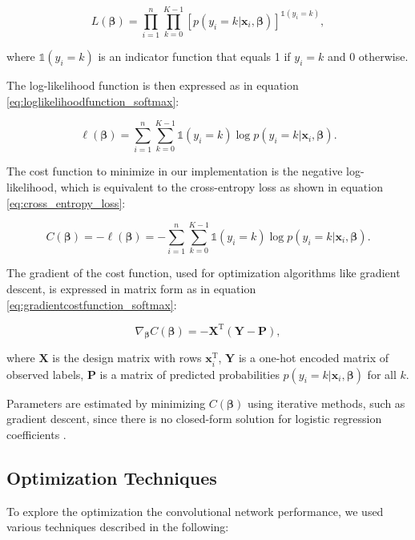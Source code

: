\begin{equation}
L(\boldsymbol{\beta}) = \prod_{i=1}^n \prod_{k=0}^{K-1} [p(y_i = k \vert \boldsymbol{x}_i, \boldsymbol{\beta})]^{\mathbb{1}(y_i = k)},
\label{eq:likelihoodfunction_softmax}
\end{equation}

where $\mathbb{1}(y_i = k)$ is an indicator function that equals 1 if $y_i = k$ and 0 otherwise.

The log-likelihood function is then expressed as in equation \ref{eq:loglikelihoodfunction_softmax}:

\begin{equation}
\ell(\boldsymbol{\beta}) = \sum_{i=1}^n \sum_{k=0}^{K-1} \mathbb{1}(y_i = k) \log p(y_i = k \vert \boldsymbol{x}_i, \boldsymbol{\beta}).
\label{eq:loglikelihoodfunction_softmax}
\end{equation}

The cost function to minimize in our implementation is the negative log-likelihood, which is equivalent to the cross-entropy loss as shown in equation \ref{eq:cross_entropy_loss}:

\begin{equation}
C(\boldsymbol{\beta}) = -\ell(\boldsymbol{\beta}) = -\sum_{i=1}^n \sum_{k=0}^{K-1} \mathbb{1}(y_i = k) \log p(y_i = k \vert \boldsymbol{x}_i, \boldsymbol{\beta}).
\label{eq:cross_entropy_loss}
\end{equation}

The gradient of the cost function, used for optimization algorithms like gradient descent, is expressed in matrix form as in equation \ref{eq:gradientcostfunction_softmax}:

\begin{equation}
\nabla_{\boldsymbol{\beta}} C(\boldsymbol{\beta}) = -\mathbf{X}^\mathrm{T} (\mathbf{Y} - \mathbf{P}),
\label{eq:gradientcostfunction_softmax}
\end{equation}

where $\mathbf{X}$ is the design matrix with rows $\boldsymbol{x}_i^\mathrm{T}$, $\mathbf{Y}$ is a one-hot encoded matrix of observed labels, $\mathbf{P}$ is a matrix of predicted probabilities $p(y_i = k \vert \boldsymbol{x}_i, \boldsymbol{\beta})$ for all $k$.

Parameters are estimated by minimizing $C(\boldsymbol{\beta})$ using iterative methods, such as gradient descent, since there is no closed-form solution for logistic regression coefficients \cite{Hjorth-Jensen_MachineLearning_2023}.

\subsection{Optimization Techniques}
To explore the optimization the convolutional network performance, we used various techniques described in the following:

